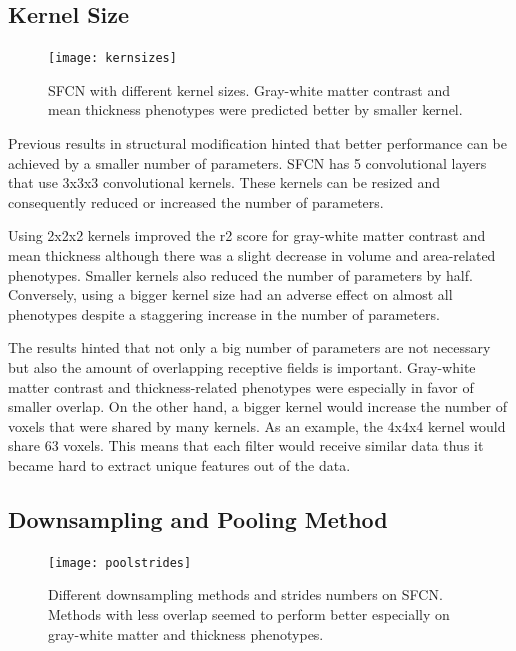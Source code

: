 \documentclass{article}
\begin{document}
    \subsection*{Kernel Size}
    
    \begin{figure}[h]
        \centering
        \texttt{[image: kernsizes]}
        \centering
        \caption{
            SFCN with different kernel sizes. 
            Gray-white matter contrast and mean thickness phenotypes were predicted better by smaller kernel.}
        \label{fig:kernsizes}
    \end{figure}

    Previous results in structural modification hinted that better performance can be achieved by a smaller number of parameters. 
    SFCN has 5 convolutional layers that use 3x3x3 convolutional kernels. These kernels can be resized and consequently reduced or increased the number of parameters. 

    Using 2x2x2 kernels improved the r2 score for gray-white matter contrast and mean thickness although there was a slight decrease in volume and area-related phenotypes. 
    Smaller kernels also reduced the number of parameters by half.  
    Conversely, using a bigger kernel size had an adverse effect on almost all phenotypes despite a staggering increase in the number of parameters.

    The results hinted that not only a big number of parameters are not necessary but also the amount of overlapping receptive fields is important. 
    Gray-white matter contrast and thickness-related phenotypes were especially in favor of smaller overlap. 
    On the other hand, a bigger kernel would increase the number of voxels that were shared by many kernels. 
    As an example, the 4x4x4 kernel would share 63 voxels. 
    This means that each filter would receive similar data thus it became hard to extract unique features out of the data.


    \subsection*{Downsampling and Pooling Method}
    
    \begin{figure}[h]
        \centering
        \texttt{[image: poolstrides]}
        \centering
        \caption{
            Different downsampling methods and strides numbers on SFCN. 
            Methods with less overlap seemed to perform better especially on gray-white matter and thickness phenotypes.}
        \label{fig:poolstrides}
    \end{figure}
\end{document}
